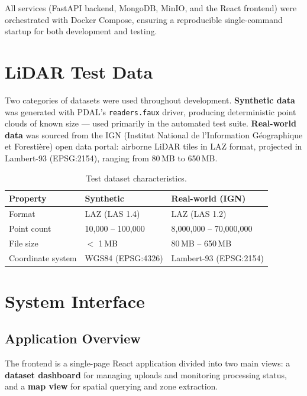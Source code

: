 All services (FastAPI backend, MongoDB, MinIO, and the React frontend) were orchestrated with Docker Compose, ensuring a reproducible single-command startup for both development and testing.

\section{LiDAR Test Data}

Two categories of datasets were used throughout development. \textbf{Synthetic data} was generated with PDAL's \texttt{readers.faux} driver, producing deterministic point clouds of known size — used primarily in the automated test suite. \textbf{Real-world data} was sourced from the IGN (Institut National de l'Information Géographique et Forestière) open data portal: airborne LiDAR tiles in LAZ format, projected in Lambert-93 (EPSG:2154), ranging from 80\,MB to 650\,MB.

\begin{table}[H]
  \centering
  \caption{Test dataset characteristics.}
  \label{tab:datasets}
  \begin{tabular}{lll}
    \toprule
    \textbf{Property} & \textbf{Synthetic} & \textbf{Real-world (IGN)} \\
    \midrule
    Format            & LAZ (LAS 1.4)        & LAZ (LAS 1.2) \\
    Point count       & 10,000 – 100,000     & 8,000,000 – 70,000,000 \\
    File size         & $<$ 1\,MB            & 80\,MB – 650\,MB \\
    Coordinate system & WGS84 (EPSG:4326)    & Lambert-93 (EPSG:2154) \\
    \bottomrule
  \end{tabular}
\end{table}

\section{System Interface}

\subsection{Application Overview}

The frontend is a single-page React application divided into two main views: a \textbf{dataset dashboard} for managing uploads and monitoring processing status, and a \textbf{map view} for spatial querying and zone extraction.

